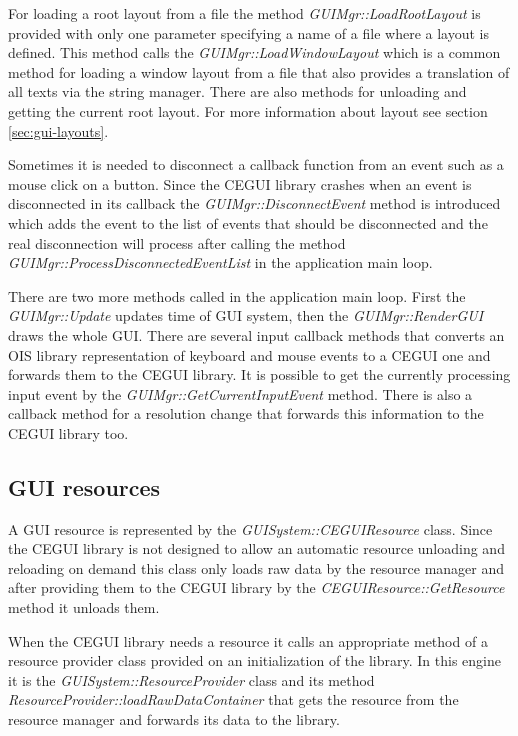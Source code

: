 For loading a root layout from a file the method \emph{GUIMgr::LoadRootLayout} is provided with only one parameter specifying a name of a file where a layout is defined. This method calls the \emph{GUIMgr::LoadWindowLayout} which is a common method for loading a window layout from a file that also provides a translation of all texts via the string manager. There are also methods for unloading and getting the current root layout. For more information about layout see section \ref{sec:gui-layouts}.

Sometimes it is needed to disconnect a callback function from an event such as a mouse click on a button. Since the CEGUI library crashes when an event is disconnected in its callback the \emph{GUIMgr::DisconnectEvent} method is introduced which adds the event to the list of events that should be disconnected and the real disconnection will process after calling the method \emph{GUIMgr::ProcessDisconnectedEventList} in the application main loop.

There are two more methods called in the application main loop. First the \emph{GUIMgr::Update} updates time of GUI system, then the \emph{GUIMgr::Render\-GUI} draws the whole GUI. There are several input callback methods that converts an OIS library representation of keyboard and mouse events to a CEGUI one and forwards them to the CEGUI library. It is possible to get the currently processing input event by the \emph{GUIMgr::GetCurrentInputEvent} method. There is also a callback method for a resolution change that forwards this information to the CEGUI library too.

\subsection{GUI resources}
\label{sec:gui-resources}

A GUI resource is represented by the \emph{GUISystem::CEGUIResource} class. Since the CEGUI library is not designed to allow an automatic resource unloading and reloading on demand this class only loads raw data by the resource manager and after providing them to the CEGUI library by the \emph{CEGUIResource::GetResource} method it unloads them.

When the CEGUI library needs a resource it calls an appropriate method of a resource provider class provided on an initialization of the library. In this engine it is the \emph{GUISystem::ResourceProvider} class and its method \emph{ResourceProvider::loadRawDataContainer} that gets the resource from the resource manager and forwards its data to the library.

